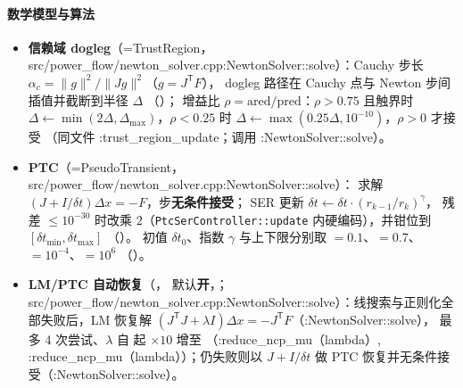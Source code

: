 \paragraph{数学模型与算法}
\begin{itemize}
  \item \textbf{信赖域 dogleg}（=TrustRegion，
        src/power\_flow/newton\_solver.cpp:NewtonSolver::solve）：Cauchy 步长
        $\alpha_c=\lVert g\rVert^2/\lVert Jg\rVert^2$（$g=J^{\mathsf T}F$），
        dogleg 路径在 Cauchy 点与 Newton 步间插值并截断到半径 $\Delta$
        （）；
        增益比 $\rho=\mathrm{ared}/\mathrm{pred}$：$\rho>0.75$ 且触界时
        $\Delta\leftarrow\min(2\Delta,\Delta_{\max})$，$\rho<0.25$ 时
        $\Delta\leftarrow\max(0.25\Delta,10^{-10})$，$\rho>0$ 才接受
        （同文件 :trust\_region\_update；调用 :NewtonSolver::solve）。
  \item \textbf{PTC}（=PseudoTransient，
        src/power\_flow/newton\_solver.cpp:NewtonSolver::solve）：
        求解 $(J+I/\delta t)\Delta x=-F$，步\textbf{无条件接受}；
        SER 更新 $\delta t\leftarrow\delta t\cdot(r_{k-1}/r_k)^\gamma$，
        残差 $\le10^{-30}$ 时改乘 $2$（\texttt{PtcSerController::update}
        内硬编码），并钳位到 $[\delta t_{\min},\delta t_{\max}]$
        （）。
        初值 $\delta t_0$、指数 $\gamma$ 与上下限分别取
        $=0.1$、$=0.7$、
        $=10^{-4}$、$=10^{6}$
        （）。
  \item \textbf{LM/PTC 自动恢复}（，
        默认\textbf{开}，；
        src/power\_flow/newton\_solver.cpp:NewtonSolver::solve）：线搜索与正则化全部失败后，LM 恢复解
        $(J^{\mathsf T}J+\lambda I)\Delta x=-J^{\mathsf T}F$（:NewtonSolver::solve），
        最多 4 次尝试、$\lambda$ 自  起 $\times10$ 增至
        （:reduce\_ncp\_mu（lambda）, :reduce\_ncp\_mu（lambda））；仍失败则以 $J+I/\delta t$ 做
        PTC 恢复并无条件接受（:NewtonSolver::solve）。
\end{itemize}

